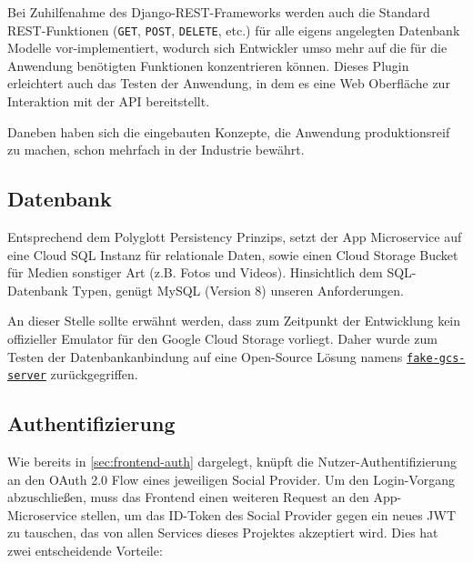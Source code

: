 \documentclass{article}
\begin{document}
Bei Zuhilfenahme des Django-REST-Frameworks werden auch die Standard REST-Funktionen (\texttt{GET}, \texttt{POST}, \texttt{DELETE}, etc.) für alle eigens angelegten Datenbank Modelle vor-implementiert, wodurch sich Entwickler umso mehr auf die für die Anwendung benötigten Funktionen konzentrieren können. Dieses Plugin erleichtert auch das Testen der Anwendung, in dem es eine Web Oberfläche zur Interaktion mit der API bereitstellt.

Daneben haben sich die eingebauten Konzepte, die Anwendung produktionsreif zu machen, schon mehrfach in der Industrie bewährt.


\subsection{Datenbank}
\label{sec:app-database}

Entsprechend dem Polyglott Persistency Prinzips, setzt der App Microservice auf eine Cloud SQL Instanz für relationale Daten, sowie einen Cloud Storage Bucket für Medien sonstiger Art (z.B. Fotos und Videos). Hinsichtlich dem SQL-Datenbank Typen, genügt MySQL (Version 8) unseren Anforderungen.

An dieser Stelle sollte erwähnt werden, dass zum Zeitpunkt der Entwicklung kein offizieller Emulator für den Google Cloud Storage vorliegt. Daher wurde zum Testen der Datenbankanbindung auf eine Open-Source Lösung namens \href{https://github.com/fsouza/fake-gcs-server}{\texttt{fake-gcs-server}} zurückgegriffen.


\subsection{Authentifizierung}
\label{sec:app-backend-auth}

Wie bereits in \autoref{sec:frontend-auth} dargelegt, knüpft die Nutzer-Authentifizierung an den OAuth 2.0 Flow eines jeweiligen Social Provider. Um den Login-Vorgang abzuschließen, muss das Frontend einen weiteren Request an den App-Microservice stellen, um das ID-Token des Social Provider gegen ein neues JWT zu tauschen, das von allen Services dieses Projektes akzeptiert wird. Dies hat zwei entscheidende Vorteile:
\end{document}

